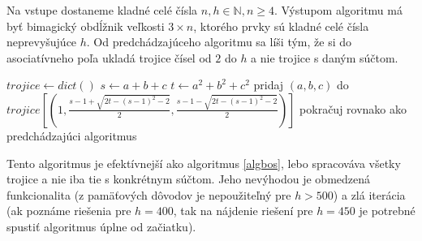\begin{alg}
\label{algboh}
Na vstupe dostaneme kladné celé čísla $n,h \in \mathbb{N}, n \geq 4$. Výstupom algoritmu má byť bimagický obdĺžnik veľkosti $3 \times n$, ktorého prvky sú kladné celé čísla neprevyšujúce $h$. Od predchádzajúceho algoritmu sa líši tým, že si do asociatívneho poľa ukladá trojice čísel od $2$ do $h$ a nie trojice s daným súčtom.
\end{alg}

\begin{algorithmic}
\STATE $trojice \gets dict()$
			\STATE $s \gets a+b+c$
			\STATE $t \gets a^2+b^2+c^2$
				\STATE pridaj $(a,b,c)$ do $trojice[(1, \frac{s-1 + \sqrt{2t - (s-1)^2 - 2}}{2}, \frac{s-1 - \sqrt{2t - (s-1)^2 - 2}}{2})]$
			\ENDIF
		\ENDFOR
	\ENDFOR
\ENDFOR
\STATE pokračuj rovnako ako predchádzajúci algoritmus
\end{algorithmic}

Tento algoritmus je efektívnejší ako algoritmus \ref{algbos}, lebo spracováva všetky trojice a nie iba tie s konkrétnym súčtom. Jeho nevýhodou je obmedzená funkcionalita (z pamäťových dôvodov je nepoužiteľný pre $h > 500$) a zlá iterácia (ak poznáme riešenia pre $h = 400$, tak na nájdenie riešení pre $h = 450$ je potrebné spustiť algoritmus úplne od začiatku).




